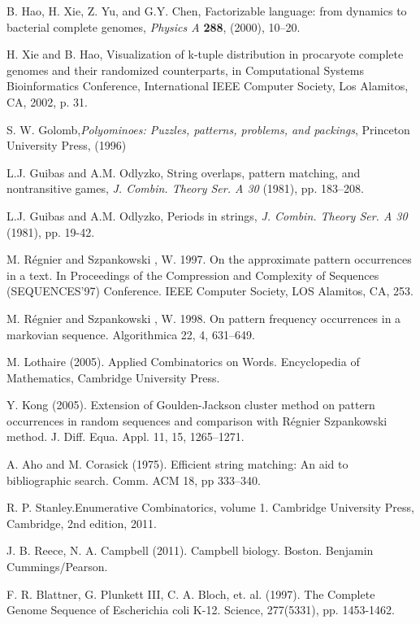 \documentclass[12pt]{report}
\begin{document}
{{\begin{thebibliography}{99}
 B. Hao, H. Xie, Z. Yu, and G.Y. Chen, Factorizable language: from dynamics to bacterial complete genomes, {\em Physics A} {\bf 288}, (2000), 10--20.

 H. Xie and B. Hao, Visualization of k-tuple distribution in procaryote complete genomes and their randomized counterparts, in Computational Systems Bioinformatics Conference, International IEEE Computer Society, Los Alamitos, CA, 2002, p. 31.

 S. W. Golomb,{\em Polyominoes: Puzzles, patterns, problems, and packings}, Princeton University Press, (1996) 

 L.J. Guibas and A.M. Odlyzko, String overlaps, pattern matching, and nontransitive games, {\em J. Combin. Theory Ser. A 30} (1981), pp. 183–208.

 L.J. Guibas and A.M. Odlyzko, Periods in strings, {\em J. Combin. Theory Ser. A 30} (1981), pp. 19-42.


M. Régnier and Szpankowski , W. 1997. On the approximate pattern occurrences in a text. In Proceedings of
the Compression and Complexity of Sequences (SEQUENCES’97) Conference. IEEE Computer Society,
LOS Alamitos, CA, 253.

M. Régnier and Szpankowski , W. 1998. On pattern frequency occurrences in a markovian sequence. Algorithmica 22, 4, 631–649.

 M. Lothaire (2005). Applied Combinatorics on Words. Encyclopedia of Mathematics, Cambridge University Press. 

 Y. Kong (2005). Extension of Goulden-Jackson cluster method on pattern occurrences in random sequences and comparison with Régnier Szpankowski method. J. Diff. Equa. Appl. 11, 15, 1265–1271.

 A. Aho and M. Corasick (1975). Efficient string matching: An aid to bibliographic search. Comm. ACM 18, pp 333–340.

 R. P. Stanley.Enumerative Combinatorics, volume 1. Cambridge University Press, Cambridge, 2nd edition, 2011.

J. B. Reece, N. A. Campbell (2011). Campbell biology. Boston. Benjamin Cummings/Pearson.

 F. R. Blattner, G. Plunkett III, C. A. Bloch, et. al. (1997). The Complete Genome Sequence of Escherichia coli K-12. Science, 277(5331), pp. 1453-1462.


\end{thebibliography}}}
\end{document}
